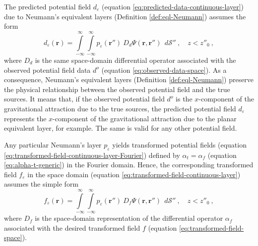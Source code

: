 \documentclass[manuscript,noblind]{geophysics}
\begin{document}
	The predicted potential field $d_{\varepsilon}$ (equation \ref{eq:predicted-data-continuous-layer}) 
	due to Neumann's equivalent layers (Definition \ref{def:eql-Neumann}) assumes the form
	\begin{equation}
		d_{\varepsilon}(\mathbf{r})
		= \int\limits_{-\infty}^{\infty}\int\limits_{-\infty}^{\infty}
		p_{\varepsilon}(\mathbf{r}'') \: D_{d} \Psi(\mathbf{r}, \mathbf{r}'') \:\: d\mathcal{S}''
		\: , \quad z < z''_{0} \: ,
		\label{eq:predicted-data-Neumann-layer}
	\end{equation}
	where $D_{d}$ is the same space-domain differential operator associated with
	the observed potential field data $d^{o}$ (equation \ref{eq:observed-data-space}).
	As a consequence, Neumann's equivalent layers (Definition \ref{def:eql-Neumann}) preserve the physical
	relationship between the observed potential field and the true sources.
	It means that, if the observed potential field $d^{o}$ is the $x$-component of the 
	gravitational attraction due to the true sources, the predicted potential field $d_{\varepsilon}$  
	represents the $x$-component of the gravitational attraction due to the planar equivalent layer, for example.
	The same is valid for any other potential field.
	
	Any particular Neumann's layer $p_{\varepsilon}$ yields transformed potential 
	fields (equation \ref{eq:transformed-field-continuous-layer-Fourier}) 
	defined by $\alpha_{t} = \alpha_{f}$ (equation \ref{eq:alpha-t-generic}) in the Fourier domain. 
	Hence, the corresponding transformed field $f_{\varepsilon}$ in the space domain 
	(equation \ref{eq:transformed-field-continuous-layer}) assumes the simple form
	\begin{equation}
		f_{\varepsilon}(\mathbf{r})
		= \int\limits_{-\infty}^{\infty}\int\limits_{-\infty}^{\infty}
		p_{\varepsilon}(\mathbf{r}'') \: D_{f} \Psi(\mathbf{r}, \mathbf{r}'') \:\: d\mathcal{S}''
		\: , \quad z < z''_{0} \: ,
		\label{eq:transformed-field-continuous-layer-Neumann}
	\end{equation}
	where $D_{f}$ is the space-domain representation of the differential operator $\alpha_{f}$ 
	associated with the desired transformed field $f$ (equation \ref{eq:transformed-field-space}).
	
\end{document}
